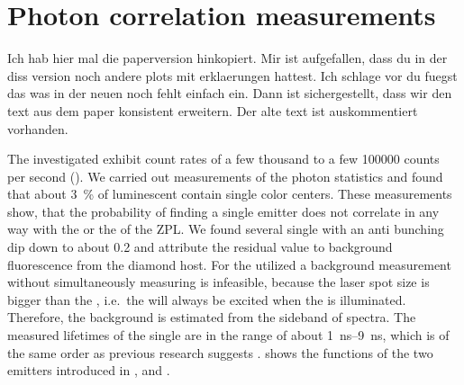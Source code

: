 	\section{Photon correlation measurements} \label{subsec::g2}

		\begin{remark}

			Ich hab hier mal die paperversion hinkopiert. Mir ist aufgefallen, dass du in der diss version noch andere plots mit erklaerungen hattest. Ich schlage vor du fuegst das was in der neuen noch fehlt einfach ein. Dann ist sichergestellt, dass wir den text aus dem paper konsistent erweitern. Der alte text ist auskommentiert vorhanden.

		\end{remark}

		The investigated \sivs exhibit count rates of a few thousand to a few \num{100000} counts per second (\SI{}{\cps}).
		We carried out measurements of the photon statistics and found that about \SI{3}{\percent} of luminescent \nds contain single color centers.
		These measurements show, that the probability of finding a single emitter does not correlate in any way with the \cwl or the \lw of the ZPL.
		We found several single \sivs with an anti bunching dip down to about \num{0.2} and attribute the residual \gtz value to background fluorescence from the diamond host.
		For the utilized \nds a background measurement without simultaneously measuring \siv \pl is infeasible, because the laser spot size is bigger than the \nd, i.e.\ the \siv will always be excited when the \nd is illuminated.
		Therefore, the background is estimated from the sideband of \siv spectra.
		The measured lifetimes of the single \sivs are in the range of about \SIrange{1}{9}{\ns}, which is of the same order as previous research suggests \cite{Sipahigil2014,Sternschulte1994}.
		 shows the \gt functions of the two emitters introduced in , \emnarrow and \embroad.

